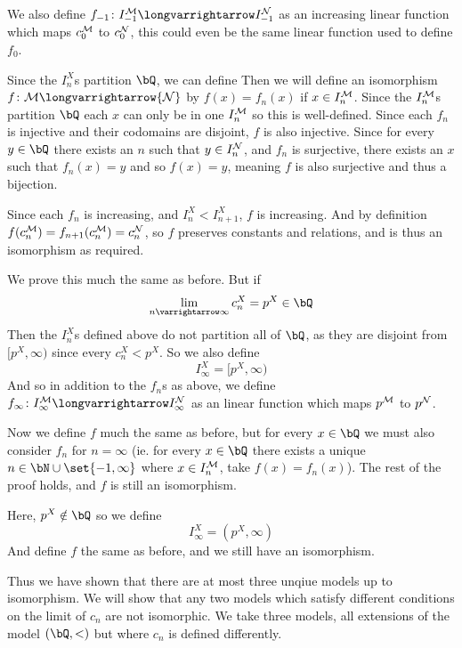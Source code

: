 \documentclass[10pt]{article}
\let\to=\varrightarrow
\let\longto=\longvarrightarrow
\def\mM{{\cal M}}
\def\mN{{\cal N}}
\begin{document}
            We also define $f_{-1}\colon I_{-1}^\mM\longto I_{-1}^\mN$ as an increasing linear function which maps $c_0^\mM$ to $c_0^\mN$, this could even be the same linear function used to define $f_0$.

            Since the $I_n^X$s partition $\bQ$, we can define
            Then we will define an isomorphism $f\colon\mM\longto\mN$ by $f(x)=f_n(x)$ if $x\in I_n^\mM$.
            Since the $I_n^\mM$s partition $\bQ$ each $x$ can only be in one $I_n^\mM$ so this is well-defined.
            Since each $f_n$ is injective and their codomains are disjoint, $f$ is also injective.
            Since for every $y\in\bQ$ there exists an $n$ such that $y\in I_n^\mN$, and $f_n$ is surjective, there exists an $x$ such that $f_n(x)=y$ and so $f(x)=y$, meaning $f$ is also surjective and thus
            a bijection.

            Since each $f_n$ is increasing, and $I_n^X<I_{n+1}^X$, $f$ is increasing.
            And by definition $f(c_n^\mM)=f_{n+1}(c_n^\mM)=c_n^\mN$, so $f$ preserves constants and relations, and is thus an isomorphism as required.

        \item We prove this much the same as before.
            But if
            \[ \lim_{n\to\infty} c_n^X = p^X\in\bQ \]
            Then the $I_n^X$s defined above do not partition all of $\bQ$, as they are disjoint from $[p^X,\infty)$ since every $c_n^X<p^X$.
            So we also define
            \[ I_\infty^X = [p^X,\infty) \]
            And so in addition to the $f_n$s as above, we define $f_\infty\colon I_\infty^\mM\longto I_\infty^\mN$ as an linear function which maps $p^\mM$ to $p^\mN$.

            Now we define $f$ much the same as before, but for every $x\in\bQ$ we must also consider $f_n$ for $n=\infty$ (ie. for every $x\in\bQ$ there exists a unique $n\in\bN\cup\set{-1,\infty}$ where
            $x\in I_n^\mM$, take $f(x)=f_n(x)$).
            The rest of the proof holds, and $f$ is still an isomorphism.

        \item Here, $p^X\notin\bQ$ so we define
            \[ I_\infty^X = (p^X,\infty) \]
            And define $f$ the same as before, and we still have an isomorphism.

    \eenum

    Thus we have shown that there are at most three unqiue models up to isomorphism.
    We will show that any two models which satisfy different conditions on the limit of $c_n$ are not isomorphic.
    We take three models, all extensions of the model $(\bQ,<)$ but where $c_n$ is defined differently.
\end{document}
